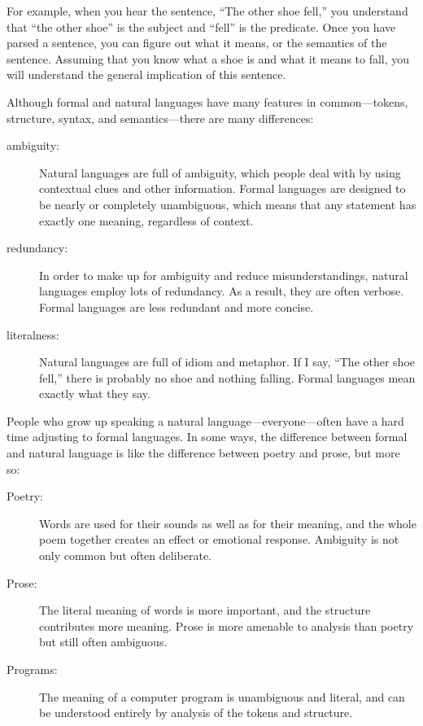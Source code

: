 For example, when you hear the sentence, ``The other shoe fell,'' you
understand that ``the other shoe'' is the subject and ``fell'' is the
predicate.  Once you have parsed a sentence, you can figure out what it
means, or the semantics of the sentence.  Assuming that you know
what a shoe is and what it means to fall, you will understand the
general implication of this sentence.

Although formal and natural languages have many features in
common---tokens, structure, syntax, and semantics---there are many
differences:


\begin{description}

\item[ambiguity:] Natural languages are full of ambiguity, which
people deal with by using contextual clues and other information.
Formal languages are designed to be nearly or completely unambiguous,
which means that any statement has exactly one meaning,
regardless of context.

\item[redundancy:] In order to make up for ambiguity and reduce
misunderstandings, natural languages employ lots of
redundancy.  As a result, they are often verbose.  Formal languages
are less redundant and more concise.

\item[literalness:] Natural languages are full of idiom and
metaphor.  If I say, ``The other shoe fell,'' there is probably
no shoe and nothing falling.  Formal languages mean
exactly what they say.

\end{description}

People who grow up speaking a natural language---everyone---often have a
hard time adjusting to formal languages.  In some ways, the difference
between formal and natural language is like the difference between
poetry and prose, but more so:


\begin{description}

\item[Poetry:] Words are used for their sounds as well as for
their meaning, and the whole poem together creates an effect or
emotional response.  Ambiguity is not only common but often
deliberate.

\item[Prose:] The literal meaning of words is more important,
and the structure contributes more meaning.  Prose is more amenable to
analysis than poetry but still often ambiguous.

\item[Programs:] The meaning of a computer program is unambiguous
and literal, and can be understood entirely by analysis of the
tokens and structure.

\end{description}

